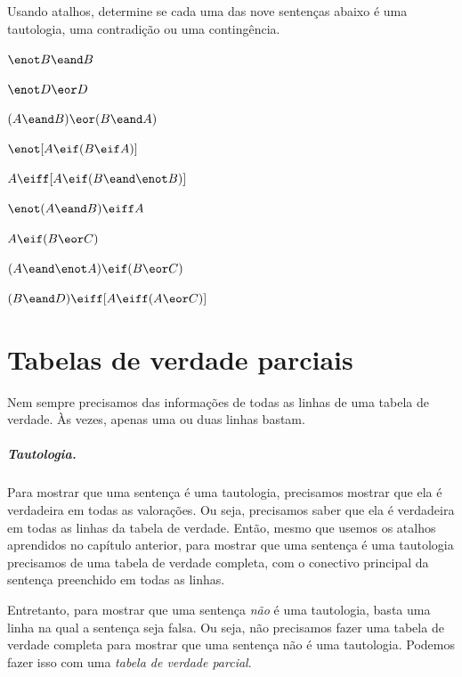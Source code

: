 \practiceproblems
\problempart
\label{pr.TT.TTorC2}
Usando atalhos, determine se cada uma das nove sentenças abaixo é uma tautologia, uma contradição ou uma contingência.
\begin{earg}
\item $\enot B \eand B$ %
\item $\enot D \eor D$ %
\item $(A\eand B) \eor (B\eand A)$ %
\item $\enot[A \eif (B \eif A)]$ %
\item $A \eiff [A \eif (B \eand \enot B)]$ %
\item $\enot(A\eand B) \eiff A$ %
\item $A\eif(B\eor C)$ %
\item $(A \eand\enot A) \eif (B \eor C)$ %
\item $(B\eand D) \eiff [A \eiff(A \eor C)]$%
\end{earg}


\chapter{Tabelas de verdade parciais}\label{s:PartialTruthTable}

Nem sempre precisamos das informações de todas as linhas de uma tabela de verdade.
Às vezes, apenas uma ou duas linhas bastam.

\paragraph{Tautologia.} 
Para mostrar que uma sentença é uma tautologia, precisamos mostrar que ela é verdadeira em todas as valorações.
Ou seja, precisamos saber que ela é verdadeira em todas as linhas da tabela de verdade.
Então, mesmo que usemos os atalhos aprendidos no capítulo anterior, para mostrar que uma sentença é uma tautologia precisamos de uma tabela de verdade completa, com o conectivo principal da sentença preenchido em todas as linhas.

Entretanto, para mostrar que uma sentença \emph{não} é uma tautologia, basta uma linha na qual a sentença seja falsa.
Ou seja, não precisamos fazer uma tabela de verdade completa para mostrar que uma sentença não é uma tautologia.
Podemos fazer isso  com uma \emph{tabela de verdade parcial}.

